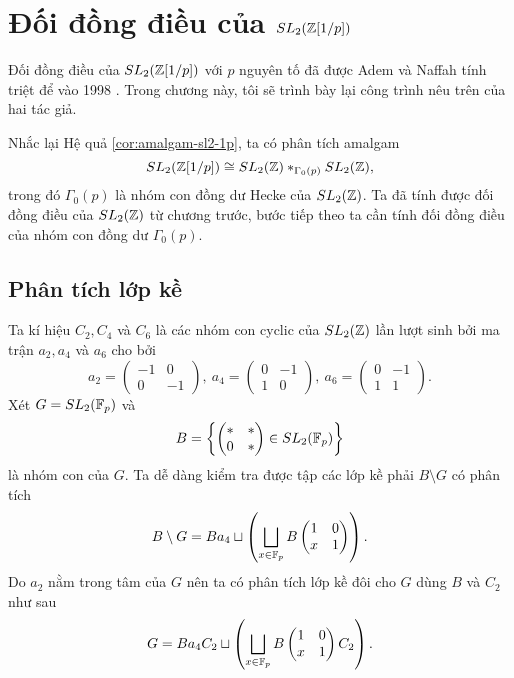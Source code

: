 \chapter{Đối đồng điều của $SL_2(\mathbb Z[1/p])$}
Đối đồng điều của $SL_2(\mathbb Z[1/p])$ với $p$ nguyên tố đã được Adem và Naffah tính triệt để vào 1998 \cite{AdemSL2}. Trong chương này, tôi sẽ trình bày lại công trình nêu trên của hai tác giả.

Nhắc lại Hệ quả \ref{cor:amalgam-sl2-1p}, ta có phân tích amalgam
$$
    SL_2(\mathbb Z[1/p]) \cong SL_2(\mathbb Z) *_{\Gamma_0(p)} SL_2(\mathbb Z),
$$
trong đó $\Gamma_0(p)$ là nhóm con đồng dư Hecke của $SL_2(\mathbb Z)$. Ta đã tính được đối đồng điều của $SL_2(\mathbb Z)$ từ chương trước, bước tiếp theo ta cần tính đối đồng điều của nhóm con đồng dư $\Gamma_0(p)$.

\section{Phân tích lớp kề}
Ta kí hiệu $C_2, C_4$ và $C_6$ là các nhóm con cyclic của $SL_2(\mathbb Z)$ lần lượt sinh bởi ma trận $a_2, a_4$ và $a_6$ cho bởi
$$
    a_{2} =\begin{pmatrix}
        -1 & 0  \\
        0  & -1
    \end{pmatrix} ,\ a_{4} =\begin{pmatrix}
        0 & -1 \\
        1 & 0
    \end{pmatrix} ,\ a_{6} =\begin{pmatrix}
        0 & -1 \\
        1 & 1
    \end{pmatrix}.
$$
Xét $G = SL_2(\mathbb F_p)$ và
$$
    B = \left\{ \begin{pmatrix}
        * & * \\
        0 & *
    \end{pmatrix} \in SL_2(\mathbb F_p) \right\}
$$
là nhóm con của $G$. Ta dễ dàng kiểm tra được tập các lớp kề phải $B \setminus G$ có phân tích
$$
    B \setminus G = B a_4 \sqcup \left( \bigsqcup_{x \in \mathbb F_p} B \begin{pmatrix}
        1 & 0 \\
        x & 1
    \end{pmatrix} \right).
$$
Do $a_2$ nằm trong tâm của $G$ nên ta có phân tích lớp kề đôi cho $G$ dùng $B$ và $C_2$ như sau
$$
    G = B a_4 C_2 \sqcup \left( \bigsqcup_{x \in \mathbb F_p} B \begin{pmatrix}
        1 & 0 \\
        x & 1
    \end{pmatrix} C_2 \right).
$$
